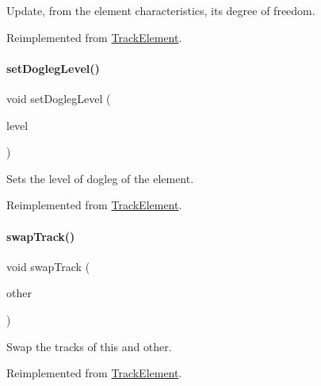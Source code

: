 Update, from the element characteristics, it\textquotesingle{}s degree of freedom. 

Reimplemented from \mbox{\hyperlink{classKite_1_1TrackElement_af5332d647c0482aa90ad7cc9b2a50f3a}{Track\+Element}}.

\mbox{\label{classKite_1_1TrackSegment_a2b90319cb042b283aa5d1fdb1992f11f}} 
\paragraph{\texorpdfstring{set\+Dogleg\+Level()}{setDoglegLevel()}}
{\footnotesize\ttfamily void set\+Dogleg\+Level (\begin{DoxyParamCaption}\item[{unsigned int}]{level }\end{DoxyParamCaption})\hspace{0.3cm}{\ttfamily [virtual]}}

Sets the level of dogleg of the element. 

Reimplemented from \mbox{\hyperlink{classKite_1_1TrackElement_a2b90319cb042b283aa5d1fdb1992f11f}{Track\+Element}}.

\mbox{\label{classKite_1_1TrackSegment_acc245ce084989d1c34816d0e61b9d510}} 
\paragraph{\texorpdfstring{swap\+Track()}{swapTrack()}}
{\footnotesize\ttfamily void swap\+Track (\begin{DoxyParamCaption}\item[{\mbox{\hyperlink{classKite_1_1TrackElement}{Track\+Element}} $\ast$}]{other }\end{DoxyParamCaption})\hspace{0.3cm}{\ttfamily [virtual]}}

Swap the tracks of {\ttfamily this} and {\ttfamily other}. 

Reimplemented from \mbox{\hyperlink{classKite_1_1TrackElement_acc245ce084989d1c34816d0e61b9d510}{Track\+Element}}.

